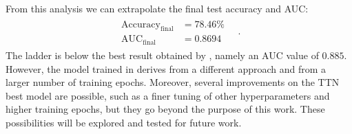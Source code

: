 \documentclass[../main/main.tex]{subfiles}
\begin{document}
From this analysis we can extrapolate the final test accuracy and AUC:
\begin{align}
    \begin{aligned}
        \mathrm{Accuracy}_{\mathrm{final}} &= 78.46 \%   \\
        \mathrm{AUC}_{\mathrm{final}} &= 0.8694
    \end{aligned}
    \quad .
\end{align}
The ladder is below the best result obtained by \cite{baldi}, namely an AUC value of \( 0.885 \). However, the model trained in \cite{baldi} derives from a different approach and from a larger number of training epochs. Moreover, several improvements on the TTN best model are possible, such as a finer tuning of other hyperparameters and higher training epochs, but they go beyond the purpose of this work. These possibilities will be explored and tested for future work.
\end{document}
